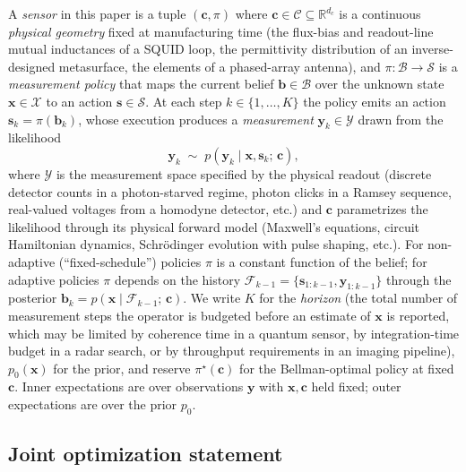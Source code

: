 \documentclass[11pt,a4paper,onecolumn]{article}
\newcommand{\R}{\mathbb{R}}
\newcommand{\bb}{\bm{b}}
\newcommand{\bx}{\bm{x}}
\newcommand{\bc}{\bm{c}}
\newcommand{\bs}{\bm{s}}
\newcommand{\by}{\bm{y}}
\begin{document}
A \emph{sensor} in this paper is a tuple $(\bc, \pi)$ where $\bc \in \mathcal{C} \subseteq \R^{d_c}$ is a continuous \emph{physical geometry} fixed at manufacturing time (the flux-bias and readout-line mutual inductances of a SQUID loop, the permittivity distribution of an inverse-designed metasurface, the elements of a phased-array antenna), and $\pi: \mathcal{B} \to \mathcal{S}$ is a \emph{measurement policy} that maps the current belief $\bb \in \mathcal{B}$ over the unknown state $\bx \in \mathcal{X}$ to an action $\bs \in \mathcal{S}$.  At each step $k \in \{1, \ldots, K\}$ the policy emits an action $\bs_k = \pi(\bb_k)$, whose execution produces a \emph{measurement} $\by_k \in \mathcal{Y}$ drawn from the likelihood
\begin{equation}
  \by_k \;\sim\; p(\by_k \mid \bx, \bs_k;\, \bc),
  \label{eq:likelihood}
\end{equation}
where $\mathcal{Y}$ is the measurement space specified by the physical readout (discrete detector counts in a photon-starved regime, photon clicks in a Ramsey sequence, real-valued voltages from a homodyne detector, etc.) and $\bc$ parametrizes the likelihood through its physical forward model (Maxwell's equations, circuit Hamiltonian dynamics, Schr\"odinger evolution with pulse shaping, etc.).  For non-adaptive (``fixed-schedule'') policies $\pi$ is a constant function of the belief; for adaptive policies $\pi$ depends on the history $\mathcal{F}_{k-1} = \{\bs_{1:k-1}, \by_{1:k-1}\}$ through the posterior $\bb_k = p(\bx \mid \mathcal{F}_{k-1};\, \bc)$.  We write $K$ for the \emph{horizon} (the total number of measurement steps the operator is budgeted before an estimate of $\bx$ is reported, which may be limited by coherence time in a quantum sensor, by integration-time budget in a radar search, or by throughput requirements in an imaging pipeline), $p_0(\bx)$ for the prior, and reserve $\pi^\star(\bc)$ for the Bellman-optimal policy at fixed $\bc$.  Inner expectations are over observations $\by$ with $\bx, \bc$ held fixed; outer expectations are over the prior $p_0$.

\subsection{Joint optimization statement}
\end{document}
